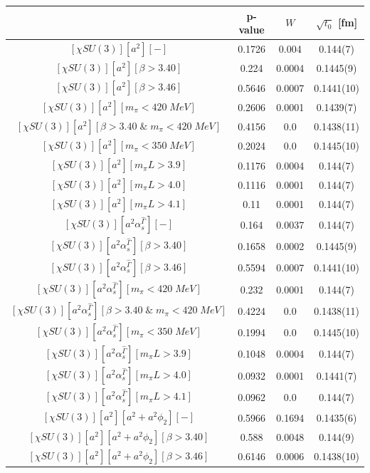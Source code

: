 \begin{longtable}{ c | c | c | c }
\toprule
 & p-value & $W$ & $\sqrt{t_0}$ [fm] \\
\midrule
$[\chi SU(3)][a^2][-]$ & 0.1726 & 0.004 & 0.144(7) \\
$[\chi SU(3)][a^2][\beta>3.40]$ & 0.224 & 0.0004 & 0.1445(9) \\
$[\chi SU(3)][a^2][\beta>3.46]$ & 0.5646 & 0.0007 & 0.1441(10) \\
$[\chi SU(3)][a^2][m_{\pi}<420\;MeV]$ & 0.2606 & 0.0001 & 0.1439(7) \\
$[\chi SU(3)][a^2][\beta>3.40\;\&\;m_{\pi}<420\;MeV]$ & 0.4156 & 0.0 & 0.1438(11) \\
$[\chi SU(3)][a^2][m_{\pi}<350\;MeV]$ & 0.2024 & 0.0 & 0.1445(10) \\
$[\chi SU(3)][a^2][m_{\pi}L>3.9]$ & 0.1176 & 0.0004 & 0.144(7) \\
$[\chi SU(3)][a^2][m_{\pi}L>4.0]$ & 0.1116 & 0.0001 & 0.144(7) \\
$[\chi SU(3)][a^2][m_{\pi}L>4.1]$ & 0.11 & 0.0001 & 0.144(7) \\
$[\chi SU(3)][a^2\alpha_s^{\hat{\Gamma}}][-]$ & 0.164 & 0.0037 & 0.144(7) \\
$[\chi SU(3)][a^2\alpha_s^{\hat{\Gamma}}][\beta>3.40]$ & 0.1658 & 0.0002 & 0.1445(9) \\
$[\chi SU(3)][a^2\alpha_s^{\hat{\Gamma}}][\beta>3.46]$ & 0.5594 & 0.0007 & 0.1441(10) \\
$[\chi SU(3)][a^2\alpha_s^{\hat{\Gamma}}][m_{\pi}<420\;MeV]$ & 0.232 & 0.0001 & 0.144(7) \\
$[\chi SU(3)][a^2\alpha_s^{\hat{\Gamma}}][\beta>3.40\;\&\;m_{\pi}<420\;MeV]$ & 0.4224 & 0.0 & 0.1438(11) \\
$[\chi SU(3)][a^2\alpha_s^{\hat{\Gamma}}][m_{\pi}<350\;MeV]$ & 0.1994 & 0.0 & 0.1445(10) \\
$[\chi SU(3)][a^2\alpha_s^{\hat{\Gamma}}][m_{\pi}L>3.9]$ & 0.1048 & 0.0004 & 0.144(7) \\
$[\chi SU(3)][a^2\alpha_s^{\hat{\Gamma}}][m_{\pi}L>4.0]$ & 0.0932 & 0.0001 & 0.1441(7) \\
$[\chi SU(3)][a^2\alpha_s^{\hat{\Gamma}}][m_{\pi}L>4.1]$ & 0.0962 & 0.0 & 0.144(7) \\
$[\chi SU(3)][a^2][a^2+a^2\phi_2][-]$ & 0.5966 & 0.1694 & 0.1435(6) \\
$[\chi SU(3)][a^2][a^2+a^2\phi_2][\beta>3.40]$ & 0.588 & 0.0048 & 0.144(9) \\
$[\chi SU(3)][a^2][a^2+a^2\phi_2][\beta>3.46]$ & 0.6146 & 0.0006 & 0.1438(10) \\

\end{longtable}
